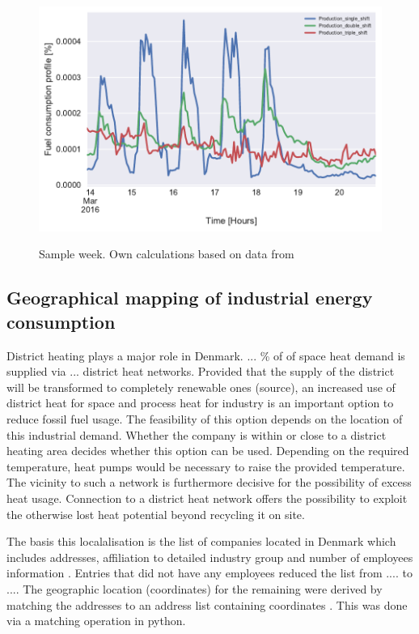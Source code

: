 \documentclass[review]{elsarticle}
\begin{document}
\begin{figure}[H]
\centering
\includegraphics[width=\linewidth]{Img/profiles/heatprofile_process_week_perc_noserv.pdf}\\
\caption{Sample week. Own calculations based on data from \cite{DanskGasDistribution2016,VM2015}}
\label{fig:heat_process_week}
\end{figure}


\subsection{Geographical mapping of industrial energy consumption}
District heating plays a major role in Denmark. ... \% of of space heat demand is supplied via ... district heat networks. Provided that the supply of the district will be transformed to completely renewable ones (source), an increased use of district heat for space and process heat for industry is an important option to reduce fossil fuel usage. The feasibility of this option depends on the location of this industrial demand. Whether the company is within or close to a district heating area decides whether this option can be used. Depending on the required temperature, heat pumps would be necessary to raise the provided temperature. The vicinity to such a network is furthermore decisive for the possibility of excess heat usage. Connection to a district heat network offers the possibility to exploit the otherwise lost heat potential beyond recycling it on site.

The basis this localalisation is the list of companies located in Denmark which includes addresses, affiliation to detailed industry group and number of employees information \cite{virk2017}. Entries that did not have any employees reduced the list from .... to .... The geographic location (coordinates) for the remaining were derived by matching the addresses to an address list containing coordinates \cite{}. This was done via a matching operation in python.
\end{document}
